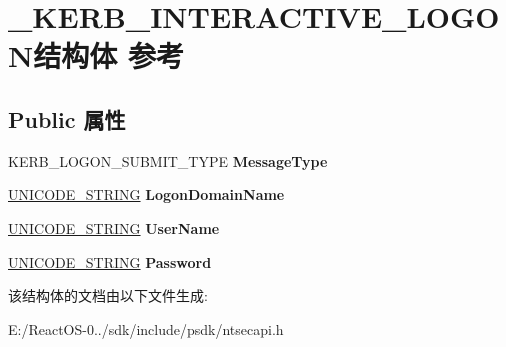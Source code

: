 \hypertarget{struct___k_e_r_b___i_n_t_e_r_a_c_t_i_v_e___l_o_g_o_n}{}\section{\+\_\+\+K\+E\+R\+B\+\_\+\+I\+N\+T\+E\+R\+A\+C\+T\+I\+V\+E\+\_\+\+L\+O\+G\+O\+N结构体 参考}
\label{struct___k_e_r_b___i_n_t_e_r_a_c_t_i_v_e___l_o_g_o_n}
\subsection*{Public 属性}
\begin{DoxyCompactItemize}
\item 
\mbox{\label{struct___k_e_r_b___i_n_t_e_r_a_c_t_i_v_e___l_o_g_o_n_a53e086feaa4edb067b8a8b454c859a71}} 
K\+E\+R\+B\+\_\+\+L\+O\+G\+O\+N\+\_\+\+S\+U\+B\+M\+I\+T\+\_\+\+T\+Y\+PE {\bfseries Message\+Type}
\item 
\mbox{\label{struct___k_e_r_b___i_n_t_e_r_a_c_t_i_v_e___l_o_g_o_n_a8be9dc81c02a7f44f2ef256bd65c86ed}} 
\hyperlink{struct___u_n_i_c_o_d_e___s_t_r_i_n_g}{U\+N\+I\+C\+O\+D\+E\+\_\+\+S\+T\+R\+I\+NG} {\bfseries Logon\+Domain\+Name}
\item 
\mbox{\label{struct___k_e_r_b___i_n_t_e_r_a_c_t_i_v_e___l_o_g_o_n_a914c85610c13bf04b5e25ea6f7bf42dd}} 
\hyperlink{struct___u_n_i_c_o_d_e___s_t_r_i_n_g}{U\+N\+I\+C\+O\+D\+E\+\_\+\+S\+T\+R\+I\+NG} {\bfseries User\+Name}
\item 
\mbox{\label{struct___k_e_r_b___i_n_t_e_r_a_c_t_i_v_e___l_o_g_o_n_a6f0222b6d1d9496faeb9eff058569027}} 
\hyperlink{struct___u_n_i_c_o_d_e___s_t_r_i_n_g}{U\+N\+I\+C\+O\+D\+E\+\_\+\+S\+T\+R\+I\+NG} {\bfseries Password}
\end{DoxyCompactItemize}


该结构体的文档由以下文件生成\+:\begin{DoxyCompactItemize}
\item 
E\+:/\+React\+O\+S-\/0../sdk/include/psdk/ntsecapi.\+h\end{DoxyCompactItemize}
